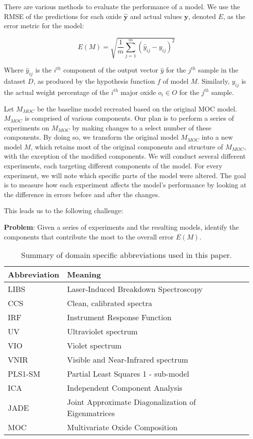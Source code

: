There are various methods to evaluate the performance of a model.
We use the RMSE of the predictions for each oxide $\mathbf{\hat{y}}$ and actual values $\mathbf{y}$, denoted $E$, as the error metric for the model:

\begin{equation}\label{eq:avg_rmse_metric}
    E(M) = \sqrt{\frac{1}{m} \sum_{j=1}^{m} (\hat{y}_{ij} - y_{ij})^2}
\end{equation}

Where \( \hat{y}_{ij} \) is the \( i^{th} \) component of the output vector \( \hat{y} \) for the \( j^{th} \) sample in the dataset \( D \), as produced by the hypothesis function \( f \) of model \( M \). Similarly, \( y_{ij} \) is the actual weight percentage of the \( i^{th} \) major oxide \( o_i \in O \) for the \( j^{th} \) sample.

Let $M_{MOC}$ be the baseline model recreated based on the original MOC model. $M_{MOC}$ is comprised of various components.
Our plan is to perform a series of experiments on $M_{MOC}$ by making changes to a select number of these components.
By doing so, we transform the original model $M_{MOC}$ into a new model $M$, which retains most of the original components and structure of $M_{MOC}$, with the exception of the modified components.
We will conduct several different experiments, each targeting different components of the model.
For every experiment, we will note which specific parts of the model were altered.
The goal is to measure how each experiment affects the model's performance by looking at the difference in errors before and after the changes.

This leads us to the following challenge:

\textbf{Problem}: Given a series of experiments and the resulting models, identify the components that contribute the most to the overall error $E(M)$.

\begin{table}
\centering
\begin{tabularx}{\columnwidth}{lX} %
\toprule
Abbreviation & Meaning \\
\midrule
LIBS & Laser-Induced Breakdown Spectroscopy \\
CCS & Clean, calibrated spectra \\
IRF & Instrument Response Function \\
UV & Ultraviolet spectrum \\
VIO & Violet spectrum \\
VNIR & Visible and Near-Infrared spectrum \\
PLS1-SM & Partial Least Squares 1 - sub-model \\
ICA & Independent Component Analysis \\
JADE & Joint Approximate Diagonalization of Eigenmatrices \\
MOC & Multivariate Oxide Composition \\
\bottomrule
\end{tabularx}
\caption{Summary of domain specific abbreviations used in this paper.}
\label{tab:abbreviations}
\end{table}